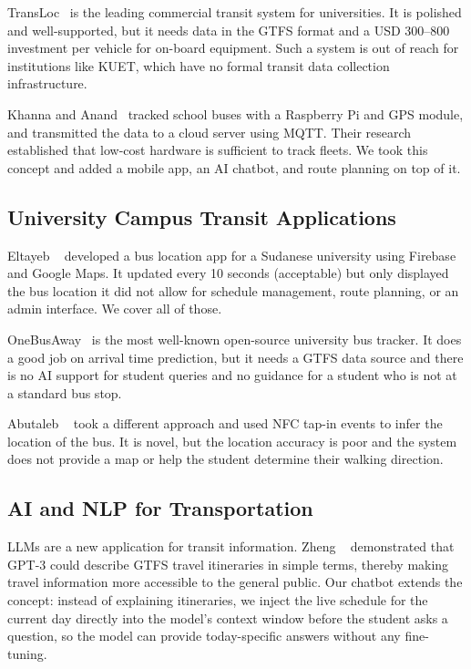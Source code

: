 \documentclass[12pt,a4paper]{report}
\begin{document}
TransLoc~\cite{transloc2024} is the leading commercial transit system for universities. It is polished and well-supported, but it needs data in the GTFS format and a USD 300--800 investment per vehicle for on-board equipment. Such a system is out of reach for institutions like KUET, which have no formal transit data collection infrastructure.

Khanna and Anand~\cite{khanna2016iot} tracked school buses with a Raspberry Pi and GPS module, and transmitted the data to a cloud server using MQTT. Their research established that low-cost hardware is sufficient to track fleets. We took this concept and added a mobile app, an AI chatbot, and route planning on top of it.

\subsection{University Campus Transit Applications}

Eltayeb ~\cite{eltayeb2021} developed a bus location app for a Sudanese university using Firebase and Google Maps. It updated every 10 seconds (acceptable) but only displayed the bus location it did not allow for schedule management, route planning, or an admin interface. We cover all of those.

OneBusAway~\cite{ferris2010onebusaway} is the most well-known open-source university bus tracker. It does a good job on arrival time prediction, but it needs a GTFS data source and there is no AI support for student queries and no guidance for a student who is not at a standard bus stop.

Abutaleb ~\cite{abutaleb2015nfc} took a different approach and used NFC tap-in events to infer the location of the bus. It is novel, but the location accuracy is poor and the system does not provide a map or help the student determine their walking direction.

\subsection{AI and NLP for Transportation}

LLMs are a new application for transit information. Zheng ~\cite{zheng2024llm} demonstrated that GPT-3 could describe GTFS travel itineraries in simple terms, thereby making travel information more accessible to the general public. Our chatbot extends the concept: instead of explaining itineraries, we inject the live schedule for the current day directly into the model's context window before the student asks a question, so the model can provide today-specific answers without any fine-tuning.
\end{document}
